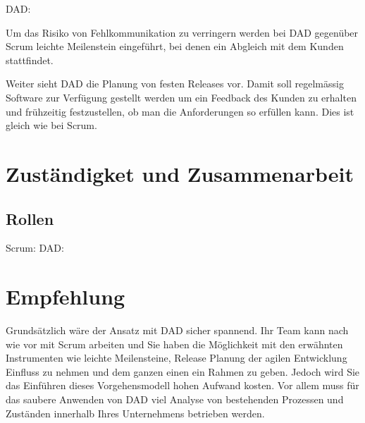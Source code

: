\bigskip 

{\Large DAD:} \medskip

Um das Risiko von Fehlkommunikation zu verringern werden bei DAD gegenüber Scrum leichte Meilenstein eingeführt, bei denen ein Abgleich mit dem Kunden stattfindet. \medskip

Weiter sieht DAD die Planung von festen Releases vor. Damit soll regelmässig Software zur Verfügung gestellt werden um ein Feedback des Kunden zu erhalten und frühzeitig festzustellen, ob man die Anforderungen so erfüllen kann. Dies ist gleich wie bei Scrum.

\section{Zuständigket und Zusammenarbeit}
\subsection{Rollen}
{\Large Scrum:} \medskip
{\Large DAD:} \medskip


\section{Empfehlung}

Grundsätzlich wäre der Ansatz mit DAD sicher spannend. Ihr Team kann nach wie vor mit Scrum arbeiten und Sie haben die Möglichkeit mit den erwähnten Instrumenten wie leichte Meilensteine, Release Planung der agilen Entwicklung Einfluss zu nehmen und dem ganzen einen ein Rahmen zu geben. \newline
Jedoch wird Sie das Einführen dieses Vorgehensmodell hohen Aufwand kosten. Vor allem muss für das saubere Anwenden von DAD viel Analyse von bestehenden Prozessen und Zuständen innerhalb Ihres Unternehmens betrieben werden.



	